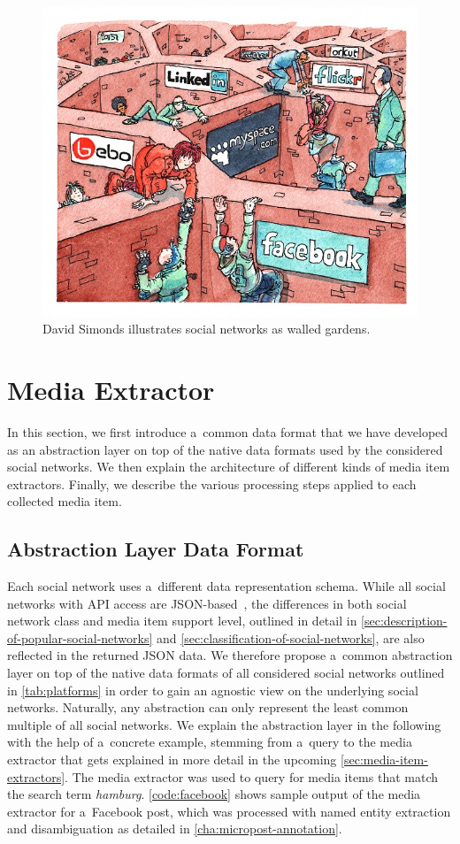 \begin{figure}[h!]
  \centering
  \includegraphics[width=0.7\linewidth,
    trim=16px 17px 12px 15px,clip]{davidsimonds.jpg}
  \caption[David Simonds illustrates social networks as walled
    gardens.]
    {David Simonds illustrates social networks as walled
    gardens.}
  \label{fig:walled-gardens}
\end{figure}

\section{Media Extractor}
\label{sec:media-extractor}

In this section, we first introduce a~common data format
that we have developed as an abstraction layer on top of the native
data formats used by the considered social networks.
We then explain the architecture
of different kinds of media item extractors.
Finally, we describe the various processing steps
applied to each collected media item.

\subsection{Abstraction Layer Data Format}
\label{sec:data-format}

Each social network uses a~different data representation schema.
While all social networks with API access are
JSON-based~\cite{crockford2006json}, the differences in both 
social network class and media item support level,
outlined in detail in
\autoref{sec:description-of-popular-social-networks} and
\autoref{sec:classification-of-social-networks},
are also reflected in the returned JSON data.
We therefore propose a~common abstraction layer 
on top of the native data formats of all considered social networks
outlined in \autoref{tab:platforms} in order to gain
an agnostic view on the underlying social networks.
Naturally, any abstraction can only represent the
least common multiple of all social networks.
We explain the abstraction layer in the following
with the help of a~concrete example,
stemming from a~query to the media extractor
that gets explained in more detail
in the upcoming \autoref{sec:media-item-extractors}.
The media extractor was used to query for media items
that match the search term \emph{hamburg}.
\autoref{code:facebook} shows sample output of the media extractor
for a~Facebook post, which was processed
with named entity extraction and disambiguation 
as detailed in \autoref{cha:micropost-annotation}.

